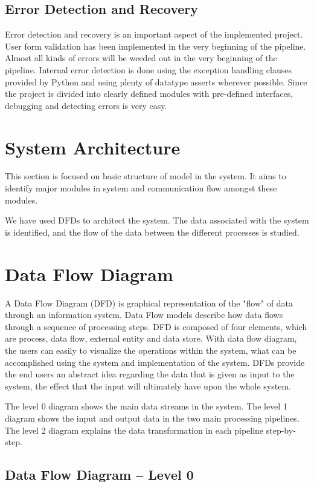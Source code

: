     \subsection{Error Detection and Recovery}
    Error detection and recovery is an important aspect of the implemented
    project. User form validation has been implemented in the very beginning of
    the pipeline. Almost all kinds of errors will be weeded out in the very
    beginning of the pipeline. Internal error detection is done using the
    exception handling clauses provided by Python and using plenty of datatype
    asserts wherever possible. Since the project is divided into clearly
    defined modules with pre-defined interfaces, debugging and detecting
    errors is very easy.

\section{System Architecture}
This section is focused on basic structure of model in the system. It aims to
identify major modules in system and communication flow amongst these modules.

We have used DFDs to architect the system. The data associated with the system
is identified, and the flow of the data between the different processes is
studied.

\section{Data Flow Diagram}

A Data Flow Diagram (DFD) is graphical representation of the "flow" of data
through an information system. Data Flow models describe how data flows through
a sequence of processing steps. DFD is composed of four elements, which are
process, data flow, external entity and data store. With data flow diagram, the
users can easily to visualize the operations within the system, what can be
accomplished using the system and implementation of the system. DFDs provide
the end users an abstract idea regarding the data that is given as input to the
system, the effect that the input will ultimately have upon the whole system.

The level 0 diagram shows the main data streams in the system. The level 1
diagram shows the input and output data in the two main processing pipelines.
The level 2 diagram explains the data transformation in each pipeline
step-by-step.

    \subsection{Data Flow Diagram – Level 0}

